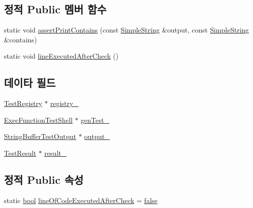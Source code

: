 \subsection*{정적 Public 멤버 함수}
\begin{DoxyCompactItemize}
\item 
static void \hyperlink{class_test_testing_fixture_aaee867c667ea567678189f84070605f9}{assert\+Print\+Contains} (const \hyperlink{class_simple_string}{Simple\+String} \&output, const \hyperlink{class_simple_string}{Simple\+String} \&contains)
\item 
static void \hyperlink{class_test_testing_fixture_a7062bf952f72b1458240e3ceb5c3d237}{line\+Executed\+After\+Check} ()
\end{DoxyCompactItemize}
\subsection*{데이타 필드}
\begin{DoxyCompactItemize}
\item 
\hyperlink{class_test_registry}{Test\+Registry} $\ast$ \hyperlink{class_test_testing_fixture_a06daa3d9c1f367883447738388bd760d}{registry\+\_\+}
\item 
\hyperlink{class_exec_function_test_shell}{Exec\+Function\+Test\+Shell} $\ast$ \hyperlink{class_test_testing_fixture_a4fb8d35501f68baa40fd56474d3f246b}{gen\+Test\+\_\+}
\item 
\hyperlink{class_string_buffer_test_output}{String\+Buffer\+Test\+Output} $\ast$ \hyperlink{class_test_testing_fixture_a1a9a780805871c30a09c52fe437374fe}{output\+\_\+}
\item 
\hyperlink{class_test_result}{Test\+Result} $\ast$ \hyperlink{class_test_testing_fixture_acf81b99797e96c7d602ffc4c3cb012b0}{result\+\_\+}
\end{DoxyCompactItemize}
\subsection*{정적 Public 속성}
\begin{DoxyCompactItemize}
\item 
static \hyperlink{avb__gptp_8h_af6a258d8f3ee5206d682d799316314b1}{bool} \hyperlink{class_test_testing_fixture_adbc177067f58e8ba7023e1cdcd830357}{line\+Of\+Code\+Executed\+After\+Check} = \hyperlink{avb__gptp_8h_af6a258d8f3ee5206d682d799316314b1ae9de385ef6fe9bf3360d1038396b884c}{false}
\end{DoxyCompactItemize}


